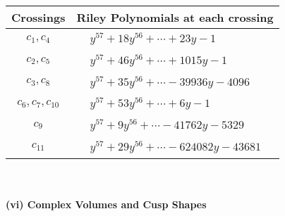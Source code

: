 \documentclass[1p]{elsarticle_modified}
\theoremstyle{definition}
\begin{document}
\begin{tabular}{m{50pt}|m{274pt}}
Crossings & \hspace{64pt}Riley Polynomials at each crossing \\
\hline $$\begin{aligned}c_{1},c_{4}\end{aligned}$$&$\begin{aligned}
&y^{57}+18 y^{56}+\cdots+23 y-1
\end{aligned}$\\
\hline $$\begin{aligned}c_{2},c_{5}\end{aligned}$$&$\begin{aligned}
&y^{57}+46 y^{56}+\cdots+1015 y-1
\end{aligned}$\\
\hline $$\begin{aligned}c_{3},c_{8}\end{aligned}$$&$\begin{aligned}
&y^{57}+35 y^{56}+\cdots-39936 y-4096
\end{aligned}$\\
\hline $$\begin{aligned}c_{6},c_{7},c_{10}\end{aligned}$$&$\begin{aligned}
&y^{57}+53 y^{56}+\cdots+6 y-1
\end{aligned}$\\
\hline $$\begin{aligned}c_{9}\end{aligned}$$&$\begin{aligned}
&y^{57}+9 y^{56}+\cdots-41762 y-5329
\end{aligned}$\\
\hline $$\begin{aligned}c_{11}\end{aligned}$$&$\begin{aligned}
&y^{57}+29 y^{56}+\cdots-624082 y-43681
\end{aligned}$\\
\hline
\end{tabular}\\~\\
\newpage\flushleft \textbf{(vi) Complex Volumes and Cusp Shapes}
\end{document}
